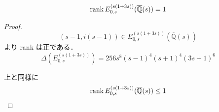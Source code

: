 \documentclass[main]{subfiles}
\begin{document}
\begin{thm}
    \begin{equation}
        \operatorname{rank} E_{0,s}^{(s(1 + 3s))}(\overline{\mathbb{Q}}(s)) = 1
    \end{equation}
\end{thm}
\begin{proof}
    \begin{equation}
        (s - 1, i(s - 1)) \in E_{0,s}^{(s(1 + 3s))}(\overline{\mathbb{Q}}(s))
    \end{equation}
    より rank は正である．
    \begin{equation}
        \Delta(E_{0,s}^{(s(1 + 3s))}) = 256s^{8}(s - 1)^{4}(s + 1)^{4}(3s + 1)^{6}
    \end{equation}

    上と同様に
    \begin{equation}
        \operatorname{rank} E_{0,s}^{(s(1 + 3s))}(\overline{\mathbb{Q}}(s)) \leq 1
    \end{equation}
\end{proof}
\end{document}
